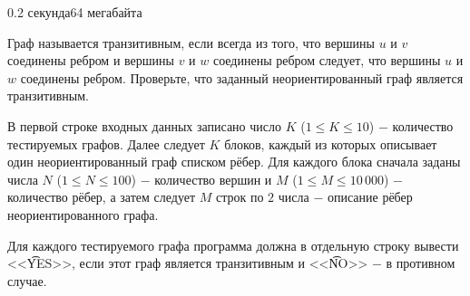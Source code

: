 \begin{problem}{}{}{}{0.2 секунда}{64 мегабайта}

Граф называется транзитивным, если всегда из того, что вершины $u$ и $v$ соединены ребром и вершины $v$ и $w$ соединены 
ребром следует, что вершины $u$ и $w$ соединены ребром. Проверьте, что заданный неориентированный граф является транзитивным.

\InputFile
В первой строке входных данных записано число $K$ ($1 \le K \le 10$) $-$ количество тестируемых графов. 
Далее следует $K$ блоков, каждый из которых описывает один неориентированный граф списком рёбер. 
Для каждого блока сначала заданы числа $N$ ($1 \le N \le 100$) $-$ количество вершин и $M$ ($1 \le M \le 10\,000$) $-$
количество рёбер, а затем следует $M$ строк по $2$ числа $-$ описание рёбер неориентированного графа.

\OutputFile
Для каждого тестируемого графа программа должна в отдельную строку вывести <<{\t{YES}}>>, если этот граф
является транзитивным и <<{\t{NO}}>> $-$ в противном случае.

\Example

\begin{example}
%
\end{example}

\end{problem}

